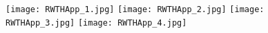 \documentclass[preview]{standalone}
\begin{document}
    \begin{figure}[ht]
      \centering
      \texttt{[image: RWTHApp\_1.jpg]} \texttt{[image: RWTHApp\_2.jpg]} \texttt{[image: RWTHApp\_3.jpg]} \texttt{[image: RWTHApp\_4.jpg]}
    \end{figure}
\end{document}
